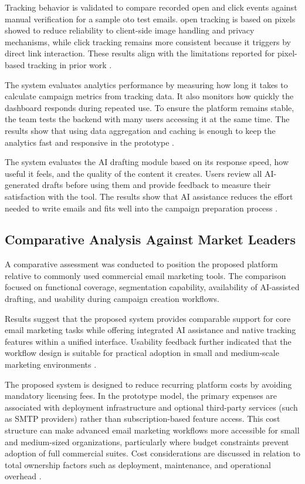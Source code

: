 \documentclass[12pt,journal,compsoc]{IEEEtran}
\begin{document}
Tracking behavior is validated to compare recorded open and click events against manual verification for a sample oto test emails. open tracking is based on pixels showed to reduce reliability to client-side image handling and privacy mechanisms, while click tracking remains more consistent because it triggers by direct link interaction. These results align with the limitations reported for pixel-based tracking in prior work \cite{ref15,ref16}.

The system evaluates analytics performance by measuring how long it takes to calculate campaign metrics from tracking data. It also monitors how quickly the dashboard responds during repeated use. To ensure the platform remains stable, the team tests the backend with many users accessing it at the same time. The results show that using data aggregation and caching is enough to keep the analytics fast and responsive in the prototype \cite{ref18,ref28}.

The system evaluates the AI drafting module based on its response speed, how useful it feels, and the quality of the content it creates. Users review all AI-generated drafts before using them and provide feedback to measure their satisfaction with the tool. The results show that AI assistance reduces the effort needed to write emails and fits well into the campaign preparation process \cite{ref4,ref7}.

\subsection{Comparative Analysis Against Market Leaders}
A comparative assessment was conducted to position the proposed platform relative to commonly used commercial email marketing tools. The comparison focused on functional coverage, segmentation capability, availability of AI-assisted drafting, and usability during campaign creation workflows.

Results suggest that the proposed system provides comparable support for core email marketing tasks while offering integrated AI assistance and native tracking features within a unified interface. Usability feedback further indicated that the workflow design is suitable for practical adoption in small and medium-scale marketing environments \cite{ref1,ref2,ref3,ref27}.

The proposed system is designed to reduce recurring platform costs by avoiding mandatory licensing fees. In the prototype model, the primary expenses are associated with deployment infrastructure and optional third-party services (such as SMTP providers) rather than subscription-based feature access. This cost structure can make advanced email marketing workflows more accessible for small and medium-sized organizations, particularly where budget constraints prevent adoption of full commercial suites. Cost considerations are discussed in relation to total ownership factors such as deployment, maintenance, and operational overhead \cite{ref20}.
\end{document}
